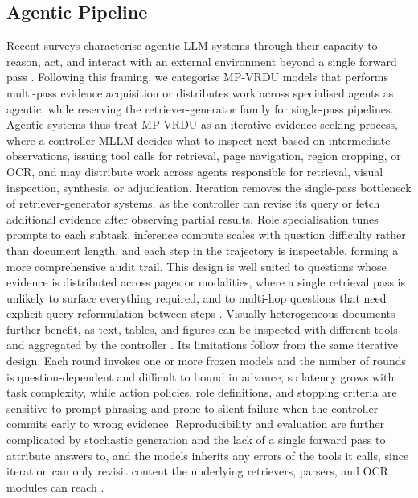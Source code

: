 \documentclass[11pt]{article}
\begin{document}
\subsection{Agentic Pipeline}

Recent surveys characterise agentic LLM systems through their capacity to reason, act, and interact with an external environment beyond a single forward pass \cite{plaat2025agentic, sapkota2025aiagents}. Following this framing, we categorise MP-VRDU models that performs multi-pass evidence acquisition or distributes work across specialised agents as agentic, while reserving the retriever-generator family for single-pass pipelines. Agentic systems thus treat MP-VRDU as an iterative evidence-seeking process, where a controller MLLM decides what to inspect next based on intermediate observations, issuing tool calls for retrieval, page navigation, region cropping, or OCR, and may distribute work across agents responsible for retrieval, visual inspection, synthesis, or adjudication. Iteration removes the single-pass bottleneck of retriever-generator systems, as the controller can revise its query or fetch additional evidence after observing partial results. Role specialisation tunes prompts to each subtask, inference compute scales with question difficulty rather than document length, and each step in the trajectory is inspectable, forming a more comprehensive audit trail. This design is well suited to questions whose evidence is distributed across pages or modalities, where a single retrieval pass is unlikely to surface everything required, and to multi-hop questions that need explicit query reformulation between steps \cite{wang2025vidorag, sun2025docagent}. Visually heterogeneous documents further benefit, as text, tables, and figures can be inspected with different tools and aggregated by the controller \cite{han2025mdocagent, zhu2025doclens}. Its limitations follow from the same iterative design. Each round invokes one or more frozen models and the number of rounds is question-dependent and difficult to bound in advance, so latency grows with task complexity, while action policies, role definitions, and stopping criteria are sensitive to prompt phrasing and prone to silent failure when the controller commits early to wrong evidence. Reproducibility and evaluation are further complicated by stochastic generation and the lack of a single forward pass to attribute answers to, and the models inherits any errors of the tools it calls, since iteration can only revisit content the underlying retrievers, parsers, and OCR modules can reach \cite{wang2025vidorag, sun2025docagent}.
\end{document}
